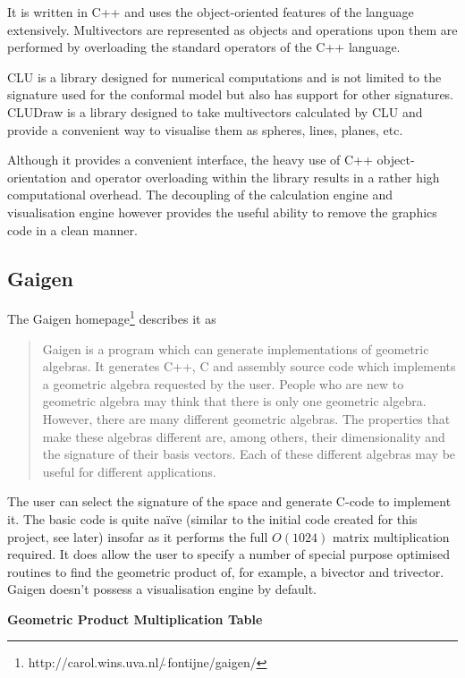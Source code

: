 It is written in C++ and uses the object-oriented features of the language
extensively. Multivectors are represented as objects and operations upon
them are performed by overloading the standard operators of the C++
language. 

CLU is a library designed for numerical computations and is not limited
to the signature used for the conformal model but also has support for
other signatures. CLUDraw is a library designed to take multivectors calculated
by CLU and provide a convenient way to visualise them as spheres, lines, planes,
etc. 

Although it provides a convenient interface, the heavy use of C++ object-orientation
and operator overloading within the library results in a rather high
computational overhead. The decoupling of the calculation engine and
visualisation engine however provides the useful ability to remove the
graphics code in a clean manner.

\subsection{Gaigen}
The Gaigen 
homepage\footnote{http://carol.wins.uva.nl/$\tilde{\ }$fontijne/gaigen/} describes 
it as
\begin{quote}
Gaigen is a program which can generate implementations of geometric algebras. It generates C++, C and assembly source code which implements a geometric algebra requested by the user. People who are new to geometric algebra may think that there is only one geometric algebra. However, there are many different geometric algebras. The properties that make these algebras different are, among others, their dimensionality and the signature of their basis vectors. Each of these different algebras may be useful for different applications.
\end{quote}
The user can select the signature of the space and generate C-code to implement it. The
basic code is quite na\"ive (similar to the initial code created for
this project, see later) insofar as it
performs the full $O(1024)$ matrix multiplication required. It does allow the
user to specify a number of special purpose optimised routines to
find the geometric product of, for example, a bivector and trivector.
Gaigen doesn't possess a visualisation engine by default.

\begin{table}
\centering
\textbf{Geometric Product Multiplication Table}\\
\rule{0cm}{0.3cm}

\caption{Example \TeX\ output from Gaigen\label{tab:gaigen_output}}
\end{table}

